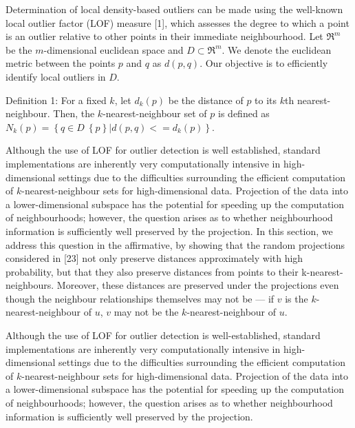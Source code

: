\cite{Khoa:2012}
Determination of local density-based outliers can be made using the well-known local outlier factor (LOF) measure [1], which assesses the degree to which a point is an outlier relative to other points in their immediate neighbourhood. Let $\Re^m$ be the $m$-dimensional euclidean space and $D \subset \Re^m$. We denote the euclidean metric between the points $p$ and $q$ as $d(p,q)$. Our objective is to efficiently identify local outliers in $D$.

Definition 1: For a fixed $k$, let $d_k(p)$ be the distance of $p$ to its $k$th nearest-neighbour. Then, the $k$-nearest-neighbour set of $p$ is defined as $N_k(p) = \left\{q \in D \ \left\{p\right\} | d(p,q)<=d_k(p)\right\}$.

Although the use of LOF for outlier detection is well established, standard implementations are inherently very computationally intensive in high-dimensional settings due to the difficulties surrounding the efficient computation of $k$-nearest-neighbour sets for high-dimensional data. Projection of the data into a lower-dimensional subspace has the potential for speeding up the computation of neighbourhoods; however, the question arises as to whether neighbourhood information is sufficiently well preserved by the projection. In this section, we address this question in the affirmative, by showing that the random projections considered in [23] not only preserve distances approximately with high probability, but that they also preserve distances from points to their k-nearest-neighbours. Moreover, these distances are preserved under the projections even though the neighbour relationships themselves may not be --- if $v$ is the $k$-nearest-neighbour of $u$, $v$ may not be the $k$-nearest-neighbour of $u$.

Although the use of LOF for outlier detection is well-established, standard implementations are inherently very computationally intensive in high-dimensional settings due to the difficulties surrounding the efficient computation of $k$-nearest-neighbour sets for high-dimensional data. Projection of the data into a lower-dimensional subspace has the potential for speeding up the computation of neighbourhoods; however, the question arises as to whether neighbourhood information is sufficiently well preserved by the projection.